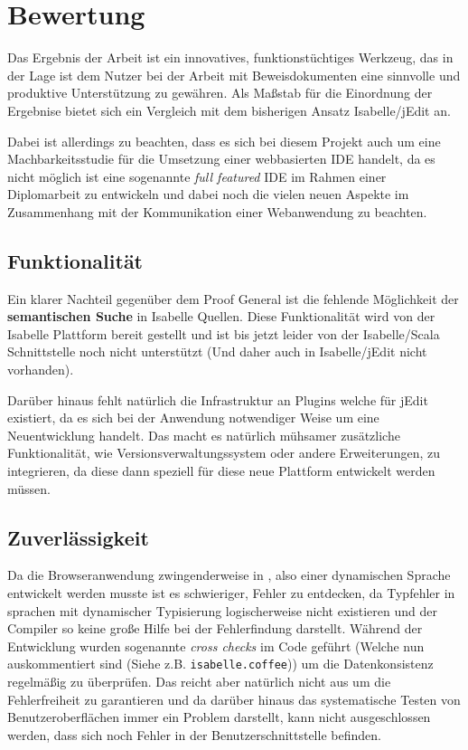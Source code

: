 \chapter{Bewertung}

Das Ergebnis der Arbeit ist ein innovatives, funktionstüchtiges Werkzeug, das in der Lage ist dem
Nutzer bei der Arbeit mit Beweisdokumenten eine sinnvolle und produktive Unterstützung zu gewähren.
Als Maßstab für die Einordnung der Ergebnise bietet sich ein Vergleich mit dem bisherigen Ansatz
Isabelle/jEdit an. 

Dabei ist allerdings zu beachten, dass es sich bei diesem Projekt auch um eine Machbarkeitsstudie
für die Umsetzung einer webbasierten IDE handelt, da es nicht möglich ist eine sogenannte
\textit{full featured} IDE im Rahmen einer Diplomarbeit zu entwickeln und dabei noch die vielen
neuen Aspekte im Zusammenhang mit der Kommunikation einer Webanwendung zu beachten.

\section{Funktionalität}

Ein klarer Nachteil gegenüber dem Proof General ist die fehlende Möglichkeit der
\textbf{semantischen Suche} in Isabelle Quellen. Diese Funktionalität wird von der Isabelle
Plattform bereit gestellt und ist bis jetzt leider von der Isabelle/Scala Schnittstelle noch nicht
unterstützt (Und daher auch in Isabelle/jEdit nicht vorhanden).

Darüber hinaus fehlt natürlich die Infrastruktur an Plugins welche für jEdit existiert, da es sich
bei der Anwendung notwendiger Weise um eine Neuentwicklung handelt. Das macht es natürlich mühsamer
zusätzliche Funktionalität, wie Versionsverwaltungssystem oder andere Erweiterungen, zu integrieren,
da diese dann speziell für diese neue Plattform entwickelt werden müssen.

\section{Zuverlässigkeit}

Da die Browseranwendung zwingenderweise in , also einer dynamischen Sprache entwickelt
werden musste ist es schwieriger, Fehler zu entdecken, da Typfehler in sprachen mit dynamischer
Typisierung logischerweise nicht existieren und der Compiler so keine große Hilfe bei der
Fehlerfindung darstellt. Während der Entwicklung wurden sogenannte \textit{cross checks} im Code
geführt (Welche nun auskommentiert sind (Siehe z.B. \texttt{isabelle.coffee})) um die
Datenkonsistenz regelmäßig zu überprüfen. Das reicht aber natürlich nicht aus um die Fehlerfreiheit
zu garantieren und da darüber hinaus das systematische Testen von Benutzeroberflächen immer ein
Problem darstellt, kann nicht ausgeschlossen werden, dass sich noch Fehler in der
Benutzerschnittstelle befinden.


